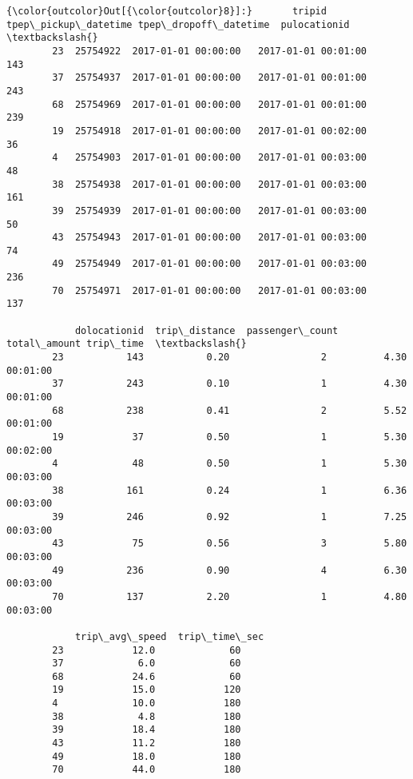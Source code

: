 \documentclass[11pt]{article}
\begin{document}
\begin{Verbatim}[commandchars=\\\{\}]
{\color{outcolor}Out[{\color{outcolor}8}]:}       tripid tpep\_pickup\_datetime tpep\_dropoff\_datetime  pulocationid  \textbackslash{}
        23  25754922  2017-01-01 00:00:00   2017-01-01 00:01:00           143   
        37  25754937  2017-01-01 00:00:00   2017-01-01 00:01:00           243   
        68  25754969  2017-01-01 00:00:00   2017-01-01 00:01:00           239   
        19  25754918  2017-01-01 00:00:00   2017-01-01 00:02:00            36   
        4   25754903  2017-01-01 00:00:00   2017-01-01 00:03:00            48   
        38  25754938  2017-01-01 00:00:00   2017-01-01 00:03:00           161   
        39  25754939  2017-01-01 00:00:00   2017-01-01 00:03:00            50   
        43  25754943  2017-01-01 00:00:00   2017-01-01 00:03:00            74   
        49  25754949  2017-01-01 00:00:00   2017-01-01 00:03:00           236   
        70  25754971  2017-01-01 00:00:00   2017-01-01 00:03:00           137   
        
            dolocationid  trip\_distance  passenger\_count  total\_amount trip\_time  \textbackslash{}
        23           143           0.20                2          4.30  00:01:00   
        37           243           0.10                1          4.30  00:01:00   
        68           238           0.41                2          5.52  00:01:00   
        19            37           0.50                1          5.30  00:02:00   
        4             48           0.50                1          5.30  00:03:00   
        38           161           0.24                1          6.36  00:03:00   
        39           246           0.92                1          7.25  00:03:00   
        43            75           0.56                3          5.80  00:03:00   
        49           236           0.90                4          6.30  00:03:00   
        70           137           2.20                1          4.80  00:03:00   
        
            trip\_avg\_speed  trip\_time\_sec  
        23            12.0             60  
        37             6.0             60  
        68            24.6             60  
        19            15.0            120  
        4             10.0            180  
        38             4.8            180  
        39            18.4            180  
        43            11.2            180  
        49            18.0            180  
        70            44.0            180  
\end{Verbatim}
            
\end{document}

